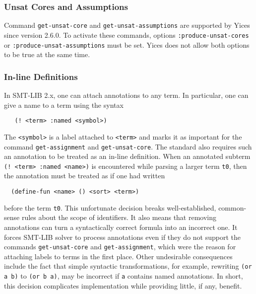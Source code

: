 \documentclass[11pt,twoside,fleqn,openright,titlepage]{cslreport}
\begin{document}
\subsubsection*{Unsat Cores and Assumptions}

Command \texttt{get-unsat-core} and \texttt{get-unsat-assumptions} are
supported by Yices since version 2.6.0. To activate these commands,
options \texttt{:produce-unsat-cores} or
\texttt{:produce-unsat-assumptions} must be set. Yices does not allow
both options to be true at the same time.

\subsubsection*{In-line Definitions}

In SMT-LIB 2.x, one can attach annotations to any term. In particular,
one can give a name to a term using the syntax
\begin{small}
\begin{verbatim}
   (! <term> :named <symbol>)
\end{verbatim}
\end{small}
The \texttt{<symbol>} is a label attached to \texttt{<term>} and marks
it as important for the command \texttt{get-assignment} and
\texttt{get-unsat-core}.  The standard also requires such an
annotation to be treated as an in-line definition. When an annotated
subterm \texttt{(! <term> :named <name>)} is encountered while parsing
a larger term \texttt{t0}, then the annotation must be treated as if
one had written
\begin{small}
\begin{verbatim}
  (define-fun <name> () <sort> <term>)
\end{verbatim}
\end{small}
before the term \texttt{t0}. This unfortunate decision breaks
well-established, common-sense rules about the scope of
identifiers. It also means that removing annotations can turn a
syntactically correct formula into an incorrect one. It forces SMT-LIB
solver to process annotations even if they do not support the commands
\texttt{get-unsat-core} and \texttt{get-assignment}, which were the
reason for attaching labels to terms in the first place.  Other
undesirable consequences include the fact that simple syntactic
transformations, for example, rewriting \texttt{(or a b)} to
\texttt{(or b a)}, may be incorrect if \texttt{a} contains named
annotations.  In short, this decision complicates implementation
while providing little, if any, benefit.
\end{document}
